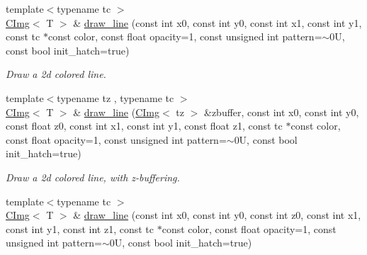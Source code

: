 \begin{DoxyCompactItemize}
\item 
{\footnotesize template$<$typename tc $>$ }\\\hyperlink{structcimg__library_1_1CImg}{CImg}$<$ T $>$ \& \hyperlink{structcimg__library_1_1CImg_a88ccbeac12af8b83cd17f9b72bbfe73b}{draw\_\-line} (const int x0, const int y0, const int x1, const int y1, const tc $\ast$const color, const float opacity=1, const unsigned int pattern=$\sim$0U, const bool init\_\-hatch=true)
\begin{DoxyCompactList}\small\item\em Draw a 2d colored line. \item\end{DoxyCompactList}\item 
\hypertarget{structcimg__library_1_1CImg_a6d1fb8342fc5606bf7986f7f9c282539}{
{\footnotesize template$<$typename tz , typename tc $>$ }\\\hyperlink{structcimg__library_1_1CImg}{CImg}$<$ T $>$ \& \hyperlink{structcimg__library_1_1CImg_a6d1fb8342fc5606bf7986f7f9c282539}{draw\_\-line} (\hyperlink{structcimg__library_1_1CImg}{CImg}$<$ tz $>$ \&zbuffer, const int x0, const int y0, const float z0, const int x1, const int y1, const float z1, const tc $\ast$const color, const float opacity=1, const unsigned int pattern=$\sim$0U, const bool init\_\-hatch=true)}
\label{structcimg__library_1_1CImg_a6d1fb8342fc5606bf7986f7f9c282539}

\begin{DoxyCompactList}\small\item\em Draw a 2d colored line, with z-\/buffering. \item\end{DoxyCompactList}\item 
\hypertarget{structcimg__library_1_1CImg_a676f12df45eea349a5423abd587d2698}{
{\footnotesize template$<$typename tc $>$ }\\\hyperlink{structcimg__library_1_1CImg}{CImg}$<$ T $>$ \& \hyperlink{structcimg__library_1_1CImg_a676f12df45eea349a5423abd587d2698}{draw\_\-line} (const int x0, const int y0, const int z0, const int x1, const int y1, const int z1, const tc $\ast$const color, const float opacity=1, const unsigned int pattern=$\sim$0U, const bool init\_\-hatch=true)}
\label{structcimg__library_1_1CImg_a676f12df45eea349a5423abd587d2698}


\end{DoxyCompactItemize}
